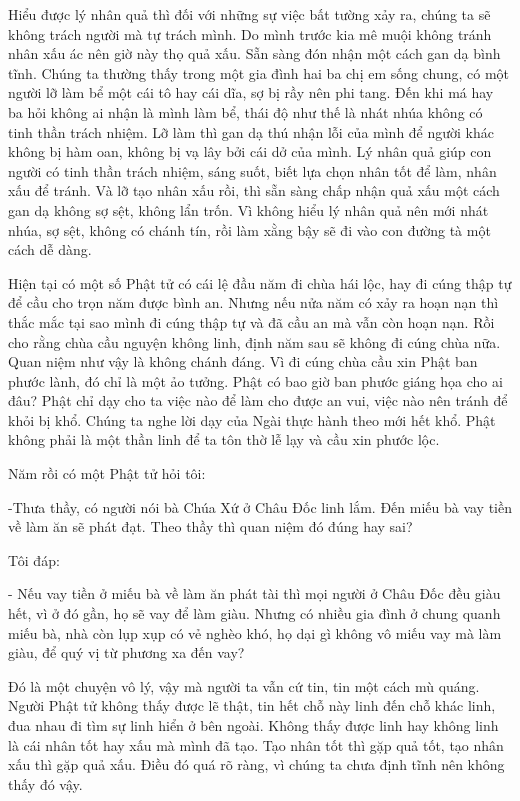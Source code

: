 \documentclass[
  12pt,
  oneside]{book}
\begin{document}
Hiểu được lý nhân quả thì đối với những sự việc bất tường xảy ra, chúng ta sẽ không trách người mà tự trách mình. Do mình trước kia mê muội không tránh nhân xấu ác nên giờ này thọ quả xấu. Sẵn sàng đón nhận một cách gan dạ bình tĩnh. Chúng ta thường thấy trong một gia đình hai ba chị em sống chung, có một người lỡ làm bể một cái tô hay cái dĩa, sợ bị rầy nên phi tang. Đến khi má hay ba hỏi không ai nhận là mình làm bể, thái độ như thế là nhát nhúa không có tinh thần trách nhiệm. Lỡ làm thì gan dạ thú nhận lỗi của mình để người khác không bị hàm oan, không bị vạ lây bởi cái dở của mình. Lý nhân quả giúp con người có tinh thần trách nhiệm, sáng suốt, biết lựa chọn nhân tốt để làm, nhân xấu để tránh. Và lỡ tạo nhân xấu rồi, thì sẵn sàng chấp nhận quả xấu một cách gan dạ không sợ sệt, không lẩn trốn. Vì không hiểu lý nhân quả nên mới nhát nhúa, sợ sệt, không có chánh tín, rồi làm xằng bậy sẽ đi vào con đường tà một cách dễ dàng.

Hiện tại có một số Phật tử có cái lệ đầu năm đi chùa hái lộc, hay đi cúng thập tự để cầu cho trọn năm được bình an. Nhưng nếu nửa năm có xảy ra hoạn nạn thì thắc mắc tại sao mình đi cúng thập tự và đã cầu an mà vẫn còn hoạn nạn. Rồi cho rằng chùa cầu nguyện không linh, định năm sau sẽ không đi cúng chùa nữa. Quan niệm như vậy là không chánh đáng. Vì đi cúng chùa cầu xin Phật ban phước lành, đó chỉ là một ảo tưởng. Phật có bao giờ ban phước giáng họa cho ai đâu? Phật chỉ dạy cho ta việc nào để làm cho được an vui, việc nào nên tránh để khỏi bị khổ. Chúng ta nghe lời dạy của Ngài thực hành theo mới hết khổ. Phật không phải là một thần linh để ta tôn thờ lễ lạy và cầu xin phước lộc.

Năm rồi có một Phật tử hỏi tôi:

-Thưa thầy, có người nói bà Chúa Xứ ở Châu Đốc linh lắm. Đến miếu bà vay tiền về làm ăn sẽ phát đạt. Theo thầy thì quan niệm đó đúng hay sai?

Tôi đáp:

- Nếu vay tiền ở miếu bà về làm ăn phát tài thì mọi người ở Châu Đốc đều giàu hết, vì ở đó gần, họ sẽ vay để làm giàu. Nhưng có nhiều gia đình ở chung quanh miếu bà, nhà còn lụp xụp có vẻ nghèo khó, họ dại gì không vô miếu vay mà làm giàu, để quý vị từ phương xa đến vay?

Đó là một chuyện vô lý, vậy mà người ta vẫn cứ tin, tin một cách mù quáng. Người Phật tử không thấy được lẽ thật, tin hết chỗ này linh đến chỗ khác linh, đua nhau đi tìm sự linh hiển ở bên ngoài. Không thấy được linh hay không linh là cái nhân tốt hay xấu mà mình đã tạo. Tạo nhân tốt thì gặp quả tốt, tạo nhân xấu thì gặp quả xấu. Điều đó quá rõ ràng, vì chúng ta chưa định tĩnh nên không thấy đó vậy.
\end{document}
